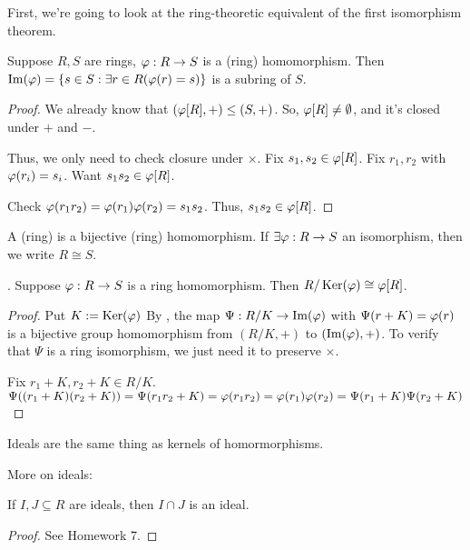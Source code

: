 \documentclass[notes.tex]{subfiles}
\begin{document}
First, we're going to look at the ring-theoretic equivalent of the first isomorphism theorem.

\begin{proposition}
	Suppose $R, S$ are rings, $\varphi:R\to S$ is a (ring) homomorphism. Then $\operatorname{\mathrm{Im}}(\varphi) = \{s\in S : \exists r\in R (\varphi(r) = s)\}$
	is a subring of $S$.
\end{proposition}
\begin{proof}
	We already know that $(\varphi[R], +) \le (S, +)$. So, $\varphi[R]\ne\emptyset$, and it's closed under $+$ and $-$.

	Thus, we only need to check closure under $\times$.
	Fix $s_1, s_2\in \varphi[R]$. Fix $r_1, r_2$ with $\varphi(r_i) = s_i$. Want $s_1s_2\in \varphi[R]$.

	Check $\varphi(r_1r_2) = \varphi(r_1)\varphi(r_2) = s_1s_2$. Thus, $s_1s_2\in \varphi[R]$.
\end{proof}

\begin{defn}
	A (ring)  is a bijective (ring) homomorphism.
	If $\exists \varphi:R\to S$ an isomorphism, then we write $R\cong S$.
\end{defn}

\begin{theorem}
\label{FITR}
.
Suppose $\varphi: R\to S$ is a ring homomorphism. Then $R/\operatorname{\mathrm{Ker}}(\varphi)\cong \varphi[R]$.
\end{theorem}
\begin{proof}
	Put $K:= \operatorname{\mathrm{Ker}}(\varphi)$
	By , the map $\Psi:R/K\to \operatorname{\mathrm{Im}}(\varphi)$ with $\Psi(r+K) = \varphi(r)$ is a bijective group homomorphism from $(R/K, +)$ to $(\operatorname{\mathrm{Im}}(\varphi), +)$.
	To verify that $\Psi$ is a ring isomorphism, we just need it to preserve $\times$.

	Fix $r_1+K, r_2+K \in R/K$. $\Psi((r_1+K)(r_2+K)) = \Psi(r_1r_2 + K) = \varphi(r_1r_2) = \varphi(r_1) \varphi(r_2) = \Psi(r_1+K)\Psi(r_2 + K)$
\end{proof} 

Ideals are the same thing as kernels of homormorphisms.

More on ideals:

\begin{proposition}
	If $I, J\subseteq R$ are ideals, then $I\cap J$ is an ideal.
\end{proposition}
\begin{proof}
	See Homework 7.
\end{proof}
\end{document}
